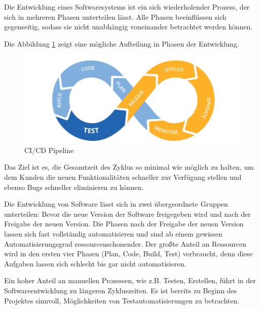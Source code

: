 Die Entwicklung eines Softwaresystems ist ein sich wiederholender Prozess, der sich in mehreren Phasen unterteilen lässt.
Alle Phasen beeinflüssen sich gegenseitig, sodass sie nicht unabhängig voneinander betrachtet werden können.

Die Abbildung \ref{fig:workflowCiCd} zeigt eine mögliche Aufteilung in Phasen der Entwicklung. 
\begin{figure}[H]
    \centering
    \includegraphics[width=1\textwidth]{../images/CiCD.png}
    \caption[CI/CD Pipeline]{CI/CD Pipeline \footnotemark}
    \label{fig:workflowCiCd}
\end{figure}

Das Ziel ist es, die Gesamtzeit des Zyklus so minimal wie möglich zu halten, um dem Kunden die neuen Funktionalitäten schneller zur Verfügung stellen und ebenso
Bugs schneller eliminieren zu können.



Die Entwicklung von Software lässt sich in zwei übergeordnete Gruppen unterteilen:
Bevor die neue Version der Software freigegeben 
wird und nach der Freigabe der neuen Version.
Die Phasen nach der Freigabe der neuen Version lassen sich fast vollständig automatisieren 
und sind ab einem gewissen Automatisierungsgrad ressourcenschonender.
Der großte Anteil an Ressourcen wird in den ersten vier Phasen (Plan, Code, Build, Test) verbraucht, 
denn diese Aufgaben lassen sich schlecht bis gar nicht automatisieren. 

Ein hoher Anteil an manuellen Prozessen, wie z.B. Testen, Erstellen, führt in der Softwareentwicklung 
zu längeren Zykluszeiten. Es ist bereits zu Beginn des Projektes sinnvoll, Möglichkeiten von Testautomatisierungen zu betrachten.


